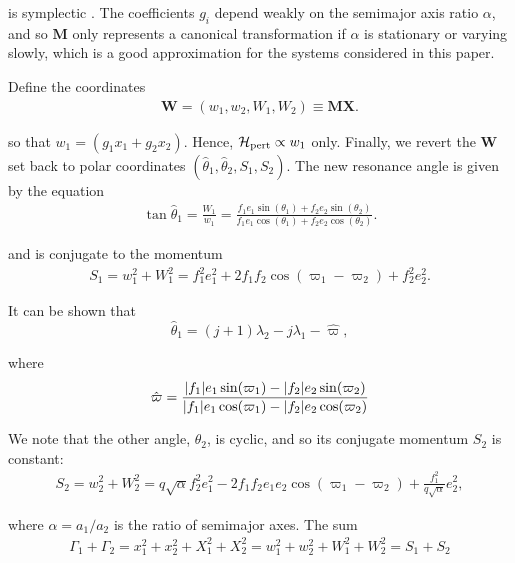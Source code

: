 \documentclass[usenatbib]{mnras}
\renewcommand{\v}[1]{\boldsymbol{ #1 }}
\DeclarePairedDelimiter{\abs}{|}{|}
\begin{document}
\noindent is symplectic \citep{goldstein_classical_2000}.
The coefficients \(g_i\) depend weakly on the semimajor axis ratio
\(\alpha\), and so \(\v M\) only represents a canonical transformation if
\(\alpha\) is stationary or varying slowly, which is a good
approximation for the systems considered in this paper.

Define the coordinates
\begin{align}
   \v W = (w_1, w_2, W_1, W_2) \equiv \v M \v X.
\end{align}

\noindent so that \(w_1 = (g_1 x_1 + g_2 x_2)\).  Hence,
\(\mathcal H_{\rm pert}\propto w_1\) only.  Finally, we revert the \(\v
W\) set back to polar coordinates
\((\hat\theta_1,\hat\theta_2,S_1,S_2)\). The new resonance angle is
given by the equation
\begin{align}
\label{hattheta}
  \tan\hat{\theta}_1 = \frac{W_1}{w_1} = \frac{f_1 e_1\sin(\theta_1)
  + f_2e_2\sin(\theta_2)}{f_1e_1\cos(\theta_1) + f_2e_2\cos(\theta_2)}.
\end{align}

\noindent
and is conjugate to the momentum
\begin{align}
  S_1 = w_1^2 + W_1^2 = f_1^2e_1^2
  + 2f_1f_2\cos(\varpi_1 - \varpi_2) + f_2^2e_2^2.
\end{align}

\noindent
It can be shown that
\begin{equation}
  \hat{\theta}_1 = (j+1)\lambda_2-j\lambda_1
  - \hat\varpi,
\end{equation}

\noindent
where
\begin{equation}
\hat\varpi = \frac{\abs{f_1} e_1\sin(\varpi_1) -
  \abs{f_2}e_2\sin(\varpi_2)} {\abs{f_1}e_1\cos(\varpi_1) -
  \abs{f_2}e_2\cos(\varpi_2)}
\end{equation}

\noindent
We note that the other angle, \(\hat\theta_2\),
is cyclic, and so its conjugate momentum \(S_2\) is constant:
\begin{align}
  S_2 = w_2^2 + W_2^2 = q\sqrt{\alpha}f_2^2e_1^2
-2f_1f_2e_1e_2\cos(\varpi_1-\varpi_2) + \frac{f_1^2}{q\sqrt\alpha}e_2^2
,
\end{align}

\noindent
where \(\alpha=a_1/a_2\) is the ratio of semimajor axes.
The sum
\begin{align}
  \Gamma_1 +\Gamma_2 = x_1^2+x_2^2 + X_1^2 + X_2^2
  = w_1^2+w_2^2 + W_1^2 + W_2^2 = S_1 + S_2
\end{align}
\end{document}
